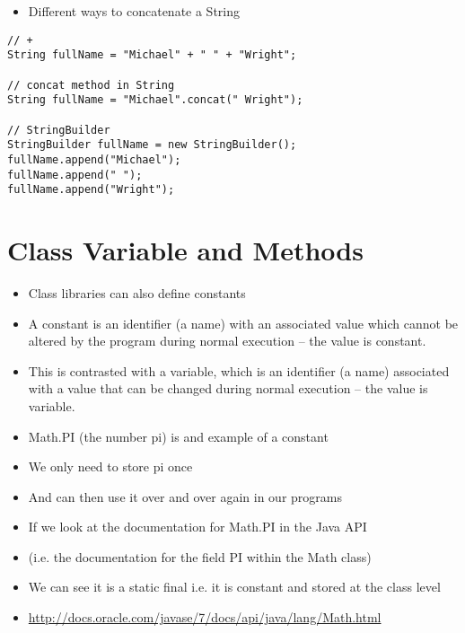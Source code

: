 \documentclass{beamer}
\begin{document}
\begin{frame}[fragile]
\begin{itemize}
\item Different ways to concatenate a String
\end{itemize}
\begin{block}{}
\begin{lstlisting}
// +
String fullName = "Michael" + " " + "Wright";

// concat method in String
String fullName = "Michael".concat(" Wright");

// StringBuilder
StringBuilder fullName = new StringBuilder();
fullName.append("Michael");
fullName.append(" ");
fullName.append("Wright");
\end{lstlisting}
\end{block}
\end{frame}

\section{Class Variable and Methods}
\begin{frame}
\begin{itemize}
\item Class libraries can also define constants
\item A constant is an identifier (a name) with an associated value which cannot be altered by the program during normal execution -- the value is constant. 
\item This is contrasted with a variable, which is an identifier (a name) associated with a value that can be changed during normal execution -- the value is variable.
\end{itemize}
\end{frame} 

\begin{frame}
\begin{itemize}
\item Math.PI (the number pi) is and example of a constant 
\item We only need to store pi once 
\item And can then use it over and over again in our programs
\item If we look at the documentation for Math.PI in the Java API 
\item (i.e. the documentation for the field PI within the Math class)
\item We can see it is a static final i.e. it is constant and stored at the class level
\item \url{http://docs.oracle.com/javase/7/docs/api/java/lang/Math.html}
\end{itemize}
\end{frame} 
\end{document}
